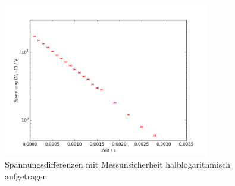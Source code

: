 \begin{figure}[h!]
	\centering
	\includegraphics[width=0.8\textwidth]{Spannung1.png}
	\caption{Spannungsdifferenzen mit Messunsicherheit halblogarithmisch aufgetragen}
	\label{fig:spannung1}
\end{figure} 

